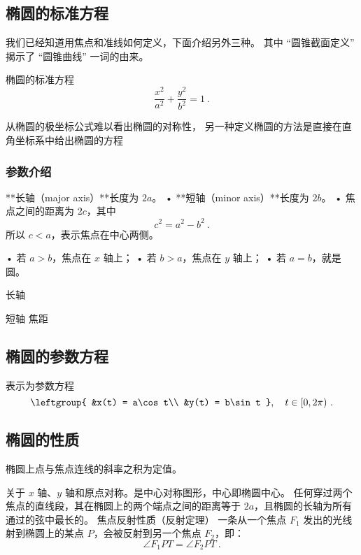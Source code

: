 \subsection{椭圆的标准方程}

我们已经知道用焦点和准线如何定义，下面介绍另外三种。 其中 “圆锥截面定义” 揭示了 “圆锥曲线” 一词的由来。

\begin{definition}{椭圆的标准方程}
\begin{equation}\label{eq_Elips3_3}
\frac{x^2}{a^2} + \frac{y^2}{b^2} = 1~.
\end{equation}
\end{definition}

从椭圆的极坐标公式难以看出椭圆的对称性， 另一种定义椭圆的方法是直接在直角坐标系中给出椭圆的方程

\subsubsection{参数介绍}

**长轴（major axis）**长度为 $2a$。
	•	**短轴（minor axis）**长度为 $2b$。
	•	焦点之间的距离为 $2c$，其中
$$ c^2 = a^2 - b^2~. $$
所以 $c < a$，表示焦点在中心两侧。

	•	若 $a > b$，焦点在 $x$ 轴上；
	•	若 $b > a$，焦点在 $y$ 轴上；
	•	若 $a = b$，就是圆。


长轴

短轴
焦距

\subsection{椭圆的参数方程}
表示为参数方程
\begin{equation}\label{eq_Elips3_1}
\leftgroup{
&x(t) = a\cos t\\
&y(t) = b\sin t
},\quad t \in [0, 2\pi) ~.
\end{equation}
\subsection{椭圆的性质}

椭圆上点与焦点连线的斜率之积为定值。

关于 $x$ 轴、$y$ 轴和原点对称。是中心对称图形，中心即椭圆中心。
任何穿过两个焦点的直线段，其在椭圆上的两个端点之间的距离等于 $2a$，且椭圆的长轴为所有通过的弦中最长的。
焦点反射性质（反射定理）
一条从一个焦点 $F_1$ 发出的光线射到椭圆上的某点 $P$，会被反射到另一个焦点 $F_2$，即：
\begin{equation}
\angle F_1PT = \angle F_2PT~.
\end{equation}

